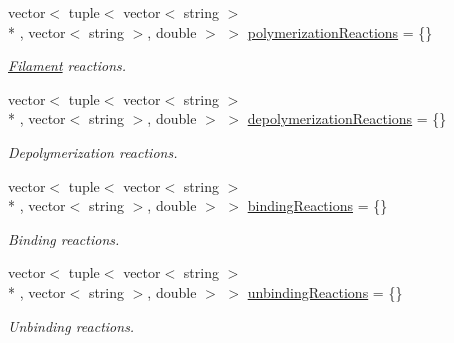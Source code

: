 {\bf }\par
\begin{DoxyCompactItemize}
\item 
vector$<$ tuple$<$ vector$<$ string $>$\\*
, vector$<$ string $>$, double $>$ $>$ \hyperlink{structChemistryData_a407c6129330a3cffc5afb45f83936945}{polymerization\+Reactions} = \{\}
\begin{DoxyCompactList}\small\item\em \hyperlink{classFilament}{Filament} reactions. \end{DoxyCompactList}\item 
vector$<$ tuple$<$ vector$<$ string $>$\\*
, vector$<$ string $>$, double $>$ $>$ \hyperlink{structChemistryData_aac04b01fc7430d924ce82eee1835cbc7}{depolymerization\+Reactions} = \{\}
\begin{DoxyCompactList}\small\item\em Depolymerization reactions. \end{DoxyCompactList}\item 
vector$<$ tuple$<$ vector$<$ string $>$\\*
, vector$<$ string $>$, double $>$ $>$ \hyperlink{structChemistryData_aec9c915b7471596fa86d4c7ae2f0f8af}{binding\+Reactions} = \{\}
\begin{DoxyCompactList}\small\item\em Binding reactions. \end{DoxyCompactList}\item 
vector$<$ tuple$<$ vector$<$ string $>$\\*
, vector$<$ string $>$, double $>$ $>$ \hyperlink{structChemistryData_a0509ae76d9f3eef9f676c4c8fbab17e7}{unbinding\+Reactions} = \{\}
\begin{DoxyCompactList}\small\item\em Unbinding reactions. \end{DoxyCompactList}\end{DoxyCompactItemize}

